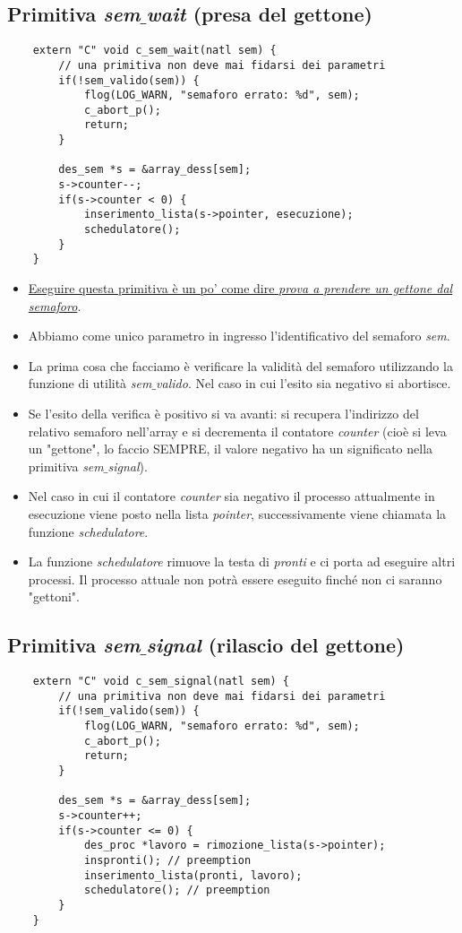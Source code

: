 \subsection{Primitiva \emph{sem$\_$wait} (presa del gettone)} 
\small 
\begin{verbatim}
	extern "C" void c_sem_wait(natl sem) {
		// una primitiva non deve mai fidarsi dei parametri
		if(!sem_valido(sem)) {
			flog(LOG_WARN, "semaforo errato: %d", sem);
			c_abort_p();
			return;
		}
		
		des_sem *s = &array_dess[sem];
		s->counter--;
		if(s->counter < 0) {
			inserimento_lista(s->pointer, esecuzione);
			schedulatore();
		}
	}
\end{verbatim}
\normalsize 
\begin{itemize}
	\item \underline{Eseguire questa primitiva è un po' come dire \textit{prova a prendere un gettone dal semaforo}}. 
	\item Abbiamo come unico parametro in ingresso l'identificativo del semaforo \emph{sem}.
	\item La prima cosa che facciamo è verificare la validità del semaforo utilizzando la funzione di utilità \emph{sem$\_$valido}. Nel caso in cui l'esito sia negativo si abortisce.
	\item Se l'esito della verifica è positivo si va avanti: si recupera l'indirizzo del relativo semaforo nell'array e si decrementa il contatore \emph{counter} (cioè si leva un "gettone", lo faccio SEMPRE, il valore negativo ha un significato nella primitiva \emph{sem$\_$signal}).
	\item Nel caso in cui il contatore \emph{counter} sia negativo il processo attualmente in esecuzione viene posto nella lista \emph{pointer}, successivamente viene chiamata la funzione \emph{schedulatore}.
	\item La funzione \emph{schedulatore} rimuove la testa di \emph{pronti} e ci porta ad eseguire altri processi. Il processo attuale non potrà essere eseguito finché non ci saranno "gettoni".
\end{itemize}
\subsection{Primitiva \emph{sem$\_$signal} (rilascio del gettone)}
\small 
\begin{verbatim}
	extern "C" void c_sem_signal(natl sem) {
		// una primitiva non deve mai fidarsi dei parametri
		if(!sem_valido(sem)) {
			flog(LOG_WARN, "semaforo errato: %d", sem);
			c_abort_p();
			return;
		}
		
		des_sem *s = &array_dess[sem];
		s->counter++;
		if(s->counter <= 0) {
			des_proc *lavoro = rimozione_lista(s->pointer);
			inspronti(); // preemption
			inserimento_lista(pronti, lavoro);
			schedulatore(); // preemption
		}
	}
\end{verbatim}
\normalsize  %

